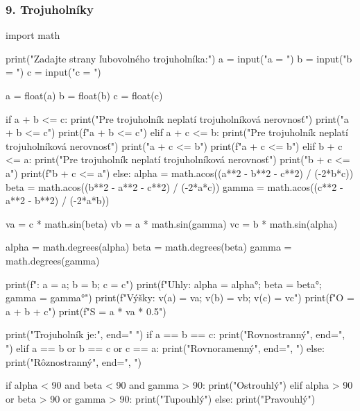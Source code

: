 \subsubsection*{9. Trojuholníky}
\begin{solution}
import math

print("Zadajte strany ľubovolného trojuholníka:")
a = input("a = ")
b = input("b = ")
c = input("c = ")

a = float(a)
b = float(b)
c = float(c)

if a + b <= c:
	print("Pre trojuholník neplatí trojuholníková nerovnosť")
	print("a + b <= c")
	print(f"{a} + {b} <= {c}")
elif a + c <= b:
	print("Pre trojuholník neplatí trojuholníková nerovnosť")
	print("a + c <= b")
	print(f"{a} + {c} <= {b}")
elif b + c <= a:
	print("Pre trojuholník neplatí trojuholníková nerovnosť")
	print("b + c <= a")
	print(f"{b} + {c} <= {a}")
else:
	alpha = math.acos((a**2 - b**2 - c**2) / (-2*b*c))
	beta = math.acos((b**2 - a**2 - c**2) / (-2*a*c))
	gamma = math.acos((c**2 - a**2 - b**2) / (-2*a*b))

	va = c * math.sin(beta)
	vb = a * math.sin(gamma)
	vc = b * math.sin(alpha)

	alpha = math.degrees(alpha)
	beta = math.degrees(beta)
	gamma = math.degrees(gamma)

    print(f"\nStrany: a = {a}; b = {b}; c = {c}")
    print(f"Uhly: alpha = {alpha}°; beta = {beta}°; gamma = {gamma}°")
    print(f"Výšky: v(a) = {va}; v(b) = {vb}; v(c) = {vc}")
    print(f"O = {a + b + c}")
    print(f"S = {a * va * 0.5}")

        print("Trojuholník je:", end=" ")
        if a == b == c:
            print("Rovnostranný", end=", ")
        elif a == b or b == c or c == a:
            print("Rovnoramenný", end=", ")
        else:
            print("Rôznostranný", end=", ")

	if alpha < 90 and beta < 90 and gamma > 90:
		print("Ostrouhlý")
	elif alpha > 90 or beta > 90 or gamma > 90:
		print("Tupouhlý")
	else:
        print("Pravouhlý")
\end{solution}
